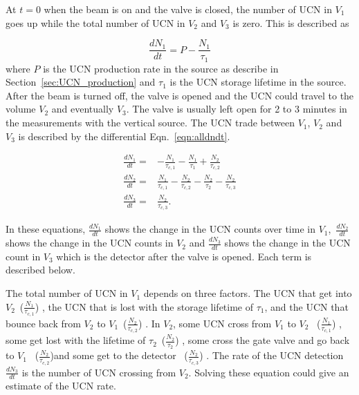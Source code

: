 At $t = 0$ when the beam is on and the valve is closed, the number of UCN in
$V_1$ goes up while the total number of UCN in $V_2$ and $V_3$ is
zero. This is described as 

\begin{equation}
  \label{eqn:dndt}
\frac{dN_1}{dt} = P - \frac{N_1}{\tau_1}  
\end{equation}
where $P$ is the UCN production rate in the source as describe in
Section~\ref{sec:UCN_production} and $\tau_1$ is the UCN storage
lifetime in the source.  After the beam is turned off, the valve is
opened and the UCN could travel to the volume $V_2$ and eventually
$V_3$. The valve is usually left open for 2 to 3 minutes in the
measurements with the vertical source. The UCN trade between $V_1$,
$V_2$ and $V_3$ is described by the differential
Eqn.~\ref{eqn:alldndt}.

\begin{equation}
  \label{eqn:alldndt}
  \begin{aligned}
    \frac{dN_1}{dt} =&- \frac{N_1}{\tau_{c,1}} - \frac{N_1}{\tau_1} + \frac{N_2}{\tau_{c,2}}  \\
    \frac{dN_2}{dt} =& \frac{N_1}{\tau_{c,1}} - \frac{N_2}{\tau_{c,2}} - \frac{N_2}{\tau_2} - \frac{N_2}{\tau_{c,3}} \\
    \frac{dN_3}{dt} =& \frac{N_2}{\tau_{c,3}}.
  \end{aligned}
\end{equation}


In these equations, \large $\frac{dN_1}{dt}$ \normalsize shows the
change in the UCN counts over time in $V_1$,~\large $\frac{dN_2}{dt}$
\normalsize shows the change in the UCN counts in $V_2$ and \large
$\frac{dN_3}{dt}$ \normalsize shows the change in the UCN count in $V_3$
which is the detector after the valve is opened. Each term is described below.

The total number of UCN in $V_1$ depends on three factors. The UCN that
get into $V_2$~\large($\frac{N_1}{\tau_{c,1}}$) \normalsize, the UCN that is lost
with the storage lifetime of $\tau_1$, and the UCN that bounce back from
$V_2$ to $V_1$~\large ($\frac{N_2}{\tau_{c,2}}$) \normalsize.
In $V_2$, some UCN cross from $V_1$ to $V_2$~ \large
($\frac{N_1}{\tau_{c,1}}$) \normalsize, some get lost with the
lifetime of $\tau_2$~\large ($\frac{N_2}{\tau_2}$) \normalsize, some
cross the gate valve and go back to $V_1$~ \large
($\frac{N_2}{\tau_{c,2}}$)\normalsize and some get to the detector
~\large ($\frac{N_2}{\tau_{c,3}}$) \normalsize. The rate of the UCN
detection $\frac{dN_3}{dt}$ is the number of UCN crossing from $V_2$.
Solving these equation could give an estimate of the UCN rate.

